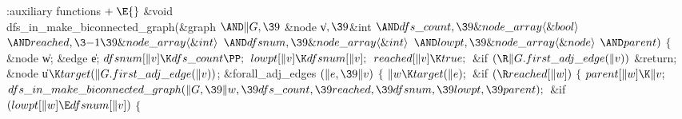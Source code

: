 \Y\B\4:auxiliary functions\X${}\mathrel+\E{}$\6
\&{void} \\{dfs\_in\_make\_biconnected\_graph}(\&{graph} ${}{\AND}\|G,\39{}$%
\&{node} \|v${},\39{}$\&{int} ${}{\AND}\\{dfs\_count},\39\&{node\_array}\langle%
\&{bool}\rangle{}$ ${}{\AND}\\{reached},\3{-1}\39\&{node\_array}\langle\&{int}%
\rangle{}$ ${}{\AND}\\{dfsnum},\39\&{node\_array}\langle\&{int}\rangle{}$ ${}{%
\AND}\\{lowpt},\39\&{node\_array}\langle\&{node}\rangle{}$ ${}{\AND}%
\\{parent}){}$\1\1\2\2\6
${}\{{}$\1\6
\&{node} \|w;\6
\&{edge} \|e;\7
${}\\{dfsnum}[\|v]\K\\{dfs\_count}\PP;{}$\6
${}\\{lowpt}[\|v]\K\\{dfsnum}[\|v];{}$\6
${}\\{reached}[\|v]\K\\{true};{}$\6
\&{if} ${}(\R\|G.\\{first\_adj\_edge}(\|v)){}$\1\5
\&{return};\2\7
\&{node} \|u${}\K\\{target}(\|G.\\{first\_adj\_edge}(\|v)){}$;\7
\&{forall\_adj\_edges} ${}(\|e,\39\|v){}$\5
${}\{{}$\1\6
${}\|w\K\\{target}(\|e);{}$\6
\&{if} ${}(\R\\{reached}[\|w]){}$\5
${}\{{}$\1\6
${}\\{parent}[\|w]\K\|v;{}$\6
${}\\{dfs\_in\_make\_biconnected\_graph}(\|G,\39\|w,\39\\{dfs\_count},\39%
\\{reached},\39\\{dfsnum},\39\\{lowpt},\39\\{parent});{}$\6
\&{if} ${}(\\{lowpt}[\|w]\E\\{dfsnum}[\|v]){}$\5
${}\{{}$\1\6
